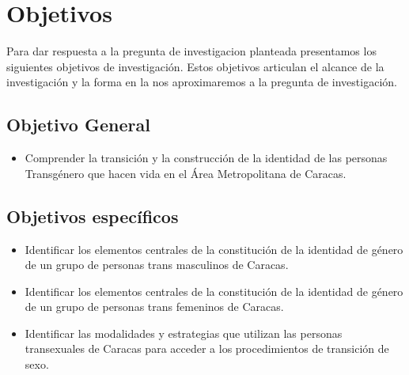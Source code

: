 	

\section{Objetivos}
Para dar respuesta a la pregunta de investigacion planteada presentamos los
siguientes objetivos de investigación.
Estos objetivos articulan el alcance de la investigación y la forma en la nos
aproximaremos a la pregunta de investigación.

\subsection{Objetivo General}
	\begin{itemize}
		\item Comprender la transición y la construcción de la identidad de las
		personas Transgénero que hacen vida en el Área Metropolitana de Caracas.
	\end{itemize}

\subsection{Objetivos específicos}
	\begin{itemize}
		\item Identificar los elementos centrales de la constitución de la identidad
	de género de un grupo de personas trans masculinos de Caracas.
		\item Identificar los elementos centrales de la constitución de la identidad
	de género de un grupo de personas trans femeninos de Caracas.
		\item Identificar las modalidades y estrategias que utilizan las personas
	transexuales de Caracas para acceder a los procedimientos de transición de sexo.
	\end{itemize}